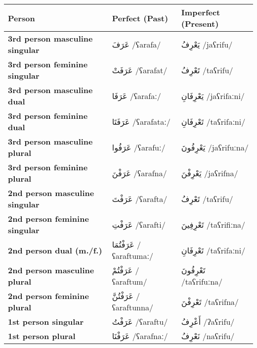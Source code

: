 \documentclass[letterpaper,12pt]{article}
\begin{document}
\begin{longtable}{|>{\raggedright}p{3.5cm}|p{5cm}|p{5cm}|}
\hline
\textbf{Person} & \textbf{Perfect (Past)} & \textbf{Imperfect (Present)} \\
\hline
\textbf{3rd person masculine singular} & \textarabic{عَرَفَ} /ʕarafa/ & \textarabic{يَعْرِفُ} /jaʕrifu/ \\
\hline
\textbf{3rd person feminine singular} & \textarabic{عَرَفَتْ} /ʕarafat/ & \textarabic{تَعْرِفُ} /taʕrifu/ \\
\hline
\textbf{3rd person masculine dual} & \textarabic{عَرَفَا} /ʕarafaː/ & \textarabic{يَعْرِفَانِ} /jaʕrifaːni/ \\
\hline
\textbf{3rd person feminine dual} & \textarabic{عَرَفَتَا} /ʕarafataː/ & \textarabic{تَعْرِفَانِ} /taʕrifaːni/ \\
\hline
\textbf{3rd person masculine plural} & \textarabic{عَرَفُوا} /ʕarafuː/ & \textarabic{يَعْرِفُونَ} /jaʕrifuːna/ \\
\hline
\textbf{3rd person feminine plural} & \textarabic{عَرَفْنَ} /ʕarafna/ & \textarabic{يَعْرِفْنَ} /jaʕrifna/ \\
\hline
\textbf{2nd person masculine singular} & \textarabic{عَرَفْتَ} /ʕarafta/ & \textarabic{تَعْرِفُ} /taʕrifu/ \\
\hline
\textbf{2nd person feminine singular} & \textarabic{عَرَفْتِ} /ʕarafti/ & \textarabic{تَعْرِفِينَ} /taʕrifiːna/ \\
\hline
\textbf{2nd person dual (m./f.)} & \textarabic{عَرَفْتُمَا} /ʕaraftumaː/ & \textarabic{تَعْرِفَانِ} /taʕrifaːni/ \\
\hline
\textbf{2nd person masculine plural} & \textarabic{عَرَفْتُمْ} /ʕaraftum/ & \textarabic{تَعْرِفُونَ} /taʕrifuːna/ \\
\hline
\textbf{2nd person feminine plural} & \textarabic{عَرَفْتُنَّ} /ʕaraftunna/ & \textarabic{تَعْرِفْنَ} /taʕrifna/ \\
\hline
\textbf{1st person singular} & \textarabic{عَرَفْتُ} /ʕaraftu/ & \textarabic{أَعْرِفُ} /ʔaʕrifu/ \\
\hline
\textbf{1st person plural} & \textarabic{عَرَفْنَا} /ʕarafnaː/ & \textarabic{نَعْرِفُ} /naʕrifu/ \\
\hline
\end{longtable}
\end{document}
